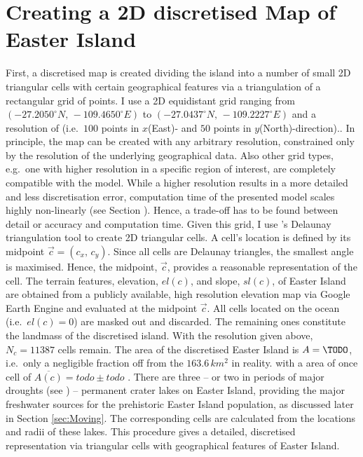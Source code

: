 \section{Creating a 2D discretised Map of Easter Island}

First, a discretised map is created dividing the island into a number of small 2D triangular cells with certain geographical features via a triangulation of a rectangular grid of points.
I use a 2D equidistant grid ranging from $(-27.2050^\circ N, \, -109.4650^\circ E)$ to $(-27.0437^\circ N, \, -109.2227^\circ E)$ and a resolution of (i.e.\ $100$ points in $x$(East)- and $50$ points in $y$(North)-direction).. 
In principle, the map can be created with any arbitrary resolution, constrained only by the resolution of the underlying geographical data. 
Also other grid types, e.g.\ one with higher resolution in a specific region of interest, are completely compatible with the model. 
While a higher resolution results in a more detailed and less discretisation error, computation time of the presented model scales highly non-linearly (see Section \TODO).
Hence, a trade-off has to be found between detail or accuracy and computation time.
Given this grid, I use \citet{matplotlib}\TODO's Delaunay triangulation tool to create 2D triangular cells.
A cell's location is defined by its midpoint $\vec{c} = (c_x,\, c_y)$. 
Since all cells are Delaunay triangles, the smallest angle is maximised. 
Hence, the midpoint, $\vec{c}$, provides a reasonable representation of the cell.
The terrain features, elevation, $el(c)$, and slope, $sl(c)$, of Easter Island are obtained from a publicly available, high resolution elevation map \citep{Jarvis2008CIGAR} via Google Earth Engine \citep{gorelick2017google} and evaluated at the midpoint $\vec{c}$.
All cells located on the ocean (i.e.\ $el(c)=0$) are masked out and discarded.
The remaining ones constitute the landmass of the discretised island. 
With the resolution given above, $N_c = 11387$ cells remain. 
The area of the discretised Easter Island is $A=\TODO$, i.e.\ only a negligible fraction off from the $163.6\, {km^2}$ in reality.
with a area of once cell of $\overline{A(c)}= todo \pm todo$ \TODO.  
There are three -- or two in periods of major droughts (see \citet{Rull2020}) -- permanent crater lakes on Easter Island, providing the major freshwater sources for the prehistoric Easter Island population, as discussed later in Section \ref{sec:Moving}.
The corresponding cells are calculated from the locations and radii of these lakes. 
This procedure gives a detailed, discretised representation via triangular cells with geographical features of Easter Island. 
 

